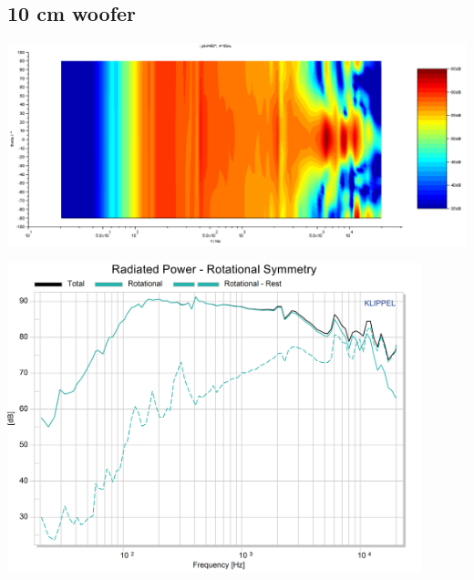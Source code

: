 \documentclass{report}
\begin{document}
\begin{appendices}
\subsection{10 cm woofer}
\label{Curves:10cm}

\begin{minipage}{0.5\textwidth}
\begin{center}
	\includegraphics[width=.9\textwidth]{Sym/contour} 
    \captionsetup{hypcap=false} 
	\label{fig:contour_10cm}
\end{center}
\end{minipage}
\begin{minipage}{0.5\textwidth}
\begin{center}
	\includegraphics[width=0.9\textwidth]{Sym/10cm_RadPow_Rot}
    \captionsetup{hypcap=false}
\end{center}
\end{minipage}


\end{appendices}
\end{document}

